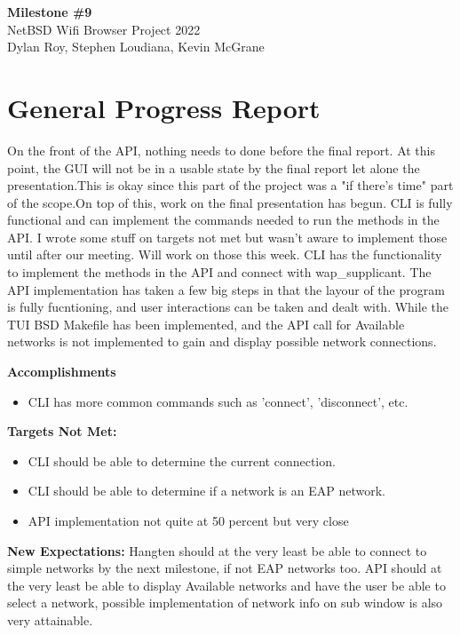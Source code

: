 \documentclass[11pt]{article}
\begin{document}
\begin{center}
  \textbf{\Large Milestone \#9}\\\large NetBSD Wifi Browser Project 2022\\
  Dylan Roy, Stephen Loudiana, Kevin McGrane
\end{center}

\section{General Progress Report}
On the front of the API, nothing needs to done before the final report.
At this point, the GUI will not be in a usable state by the final report
let alone the presentation.This is okay since this part of the project was 
a "if there's time" part of the scope.On top of this, work on the final 
presentation has begun. CLI is fully functional and can implement the 
commands needed to run the methods in the API. I wrote some stuff on 
targets not met but wasn't aware to implement those until after our 
meeting. Will work on those this week. CLI has the functionality to 
implement the methods in the API and connect with wap_supplicant. 
The API implementation has taken a few big steps in that the layour of the
program is fully fucntioning, and user interactions can be taken and dealt
with. While the TUI BSD Makefile has been implemented, and the API call for
Available networks is not implemented to gain and display possible network
connections.

\textbf{Accomplishments}
\begin{itemize}
  \item CLI has more common commands such as 'connect', 'disconnect', etc. 
\end{itemize}

\textbf{Targets Not Met:}
\begin{itemize}
  \item CLI should be able to determine the current connection. 
  \item CLI should be able to determine if a network is an EAP network. 
  \item API implementation not quite at 50 percent but very close 
\end{itemize}

\textbf{New Expectations:}
Hangten should at the very least be able to connect to simple networks by the
next milestone, if not EAP networks too. API should at the very least be able 
to display Available networks and have the user be able to select a network,
possible implementation of network info on sub window is also very attainable.
\end{document}
